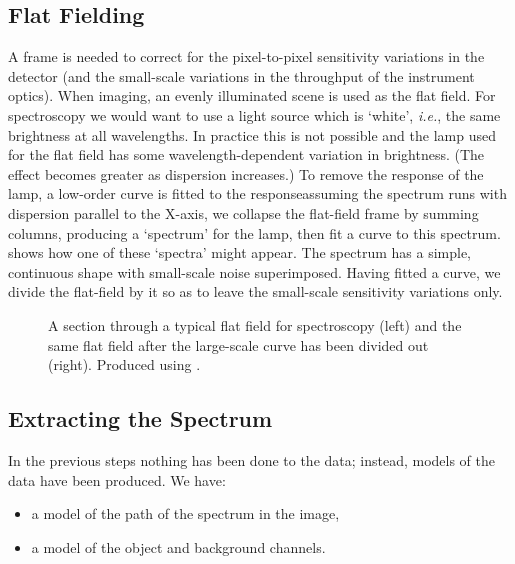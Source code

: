 \subsection{Flat Fielding}

A  frame is needed to correct for the
pixel-to-pixel sensitivity variations in the detector (and the small-scale
variations in the throughput of the instrument optics).
When imaging, an evenly illuminated scene is used as the flat field.
For spectroscopy we would want to use a light source
which is `white', {\it{i.e.}}, the same brightness at all wavelengths.
In practice this is not possible and the lamp used for the flat
field has some wavelength-dependent variation in brightness.  (The effect
becomes greater as dispersion increases.)  To remove the response
of the lamp, a low-order curve is fitted to the
response\scspec{---}{ - }assuming the spectrum runs with dispersion parallel
to the X-axis, we collapse the flat-field frame by summing columns, producing
a `spectrum' for the lamp, then fit a curve to this spectrum.
shows how one of these `spectra' might appear.
The spectrum has a simple, continuous shape with small-scale noise
superimposed.
Having fitted a curve, we divide the flat-field by it so as to leave
the small-scale sensitivity variations only.

\begin{figure}
\begin{center}
{\leavevmode\epsfysize=66mm}

\parbox{140mm}{
\caption{A section through a typical flat field for spectroscopy (left)
and the same flat field after the large-scale curve has been divided out
(right).  Produced using .}
\label{fi_flat_field}
}
\end{center}
\end{figure}


\subsection{Extracting the Spectrum}

In the previous steps nothing has been done to the data;
instead, models of the data have been produced.  We have:

\begin{itemize}

\item a model of the path of the spectrum in the image,

\item a model of the object and background channels.

\end{itemize}

